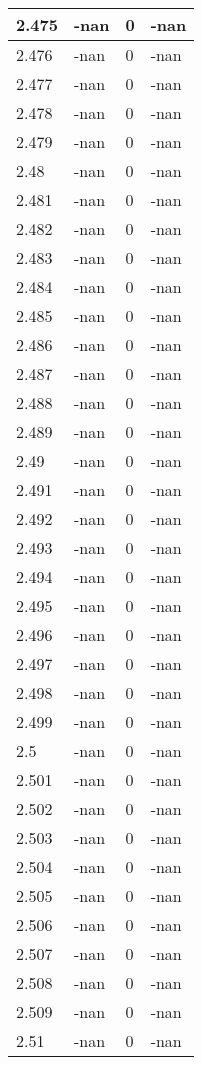 \documentclass[a4paper,14pt]{extarticle}
\begin{document}
\begin{longtable}{||m{3cm}||m{3cm}|m{3cm}||m{3cm}||}
\hline
2.475 & -nan & 0 & -nan\\
\hline
2.476 & -nan & 0 & -nan\\
\hline
2.477 & -nan & 0 & -nan\\
\hline
2.478 & -nan & 0 & -nan\\
\hline
2.479 & -nan & 0 & -nan\\
\hline
2.48 & -nan & 0 & -nan\\
\hline
2.481 & -nan & 0 & -nan\\
\hline
2.482 & -nan & 0 & -nan\\
\hline
2.483 & -nan & 0 & -nan\\
\hline
2.484 & -nan & 0 & -nan\\
\hline
2.485 & -nan & 0 & -nan\\
\hline
2.486 & -nan & 0 & -nan\\
\hline
2.487 & -nan & 0 & -nan\\
\hline
2.488 & -nan & 0 & -nan\\
\hline
2.489 & -nan & 0 & -nan\\
\hline
2.49 & -nan & 0 & -nan\\
\hline
2.491 & -nan & 0 & -nan\\
\hline
2.492 & -nan & 0 & -nan\\
\hline
2.493 & -nan & 0 & -nan\\
\hline
2.494 & -nan & 0 & -nan\\
\hline
2.495 & -nan & 0 & -nan\\
\hline
2.496 & -nan & 0 & -nan\\
\hline
2.497 & -nan & 0 & -nan\\
\hline
2.498 & -nan & 0 & -nan\\
\hline
2.499 & -nan & 0 & -nan\\
\hline
2.5 & -nan & 0 & -nan\\
\hline
2.501 & -nan & 0 & -nan\\
\hline
2.502 & -nan & 0 & -nan\\
\hline
2.503 & -nan & 0 & -nan\\
\hline
2.504 & -nan & 0 & -nan\\
\hline
2.505 & -nan & 0 & -nan\\
\hline
2.506 & -nan & 0 & -nan\\
\hline
2.507 & -nan & 0 & -nan\\
\hline
2.508 & -nan & 0 & -nan\\
\hline
2.509 & -nan & 0 & -nan\\
\hline
2.51 & -nan & 0 & -nan\\

\end{longtable}
\end{document}
